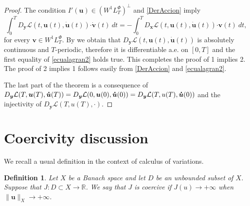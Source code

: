 \documentclass[twoside]{elsarticle}
\newtheorem{defi}[thm]{Definition}
\theoremstyle{remark}
\newcommand{\lphi}{L^{\Phi}}
\newcommand{\wphi}{W^{1}\lphi}
\renewcommand{\b}[1]{\boldsymbol{#1}}
\newcommand{\rr}{\mathbb{R}}
\newcommand{\ccdot}{\b{\cdot}}
\begin{document}
\begin{proof} The condition  $I'(\b{u})\in\left( \wphi_T\right)^{\perp}$ and \eqref{DerAccion} imply 
\[\int_0^T  D_{\b{y}} \mathcal{L}(t,\b{u}(t),\b{\dot{u}}(t))\ccdot \b{\dot{v}}(t)\ dt
=-\int_0^T  D_{\b{x}}\mathcal{L}(t,\b{u}(t),\b{\dot{u}}(t)) \ccdot\b{ v}(t)\ dt, \]
for every $\b{v}\in \wphi_T$. By \cite[pp. 6-7]{mawhin2010critical} we obtain that  $D_{\b{y}}\mathcal{L}(t,\b{u}(t),\b{\dot{u}}(t))$ is absolutely continuous and 
$T$-periodic, therefore it is differentiable a.e. on $[0,T]$ and the first equality of \eqref{ecualagran2} holds true.
This completes the proof of  1 implies 2. The proof of 2 implies  1  follows easily 
from \eqref{DerAccion}  and \eqref{ecualagran2}.

The last part of the theorem is a consequence of 
$D_{\b{y}}\mathcal{L}(T,\b{u}(T),\b{\dot{u}}(T))\linebreak=D_{\b{y}}\mathcal{L}(0,\b{u}(0),\b{\dot{u}}(0))=D_{\b{y}}\mathcal{L}(T,u(T),\b{\dot{u}}(0))$ and the injectivity of $D_{\b{y}}\mathcal{L}(T,u(T),\cdot)$.
\end{proof}


\section{Coercivity discussion}\label{sec:coer}

We recall a usual definition in the context of calculus of variations. 

\begin{defi} Let $X$ be a Banach space and let $D$ be an unbounded subset of $X$. Suppose that $J:D\subset X\to\rr$. We say that $J$ is \emph{coercive} if $J(u)\to +\infty$ when  $\|\b{u}\|_X\to +\infty$. 
\end{defi}
\end{document}

